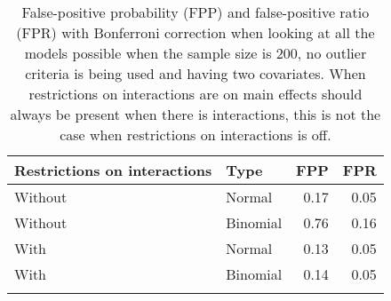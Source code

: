 \begin{longtable}{llrr}
\caption{False-positive probability (FPP) and false-positive ratio (FPR) with Bonferroni correction when looking at all the models possible when the sample size is 200, no outlier criteria is being used and having two covariates. When restrictions on interactions are on main effects should always be present when there is interactions, this is not the case when restrictions on interactions is off.} \\ 
  \hline
Restrictions on interactions & Type & FPP & FPR \\ 
  \hline
Without & Normal & 0.17 & 0.05 \\ 
  Without & Binomial & 0.76 & 0.16 \\ 
  With & Normal & 0.13 & 0.05 \\ 
  With & Binomial & 0.14 & 0.05 \\ 
   \hline
\hline
\label{tab:resultFullBC}
\end{longtable}
